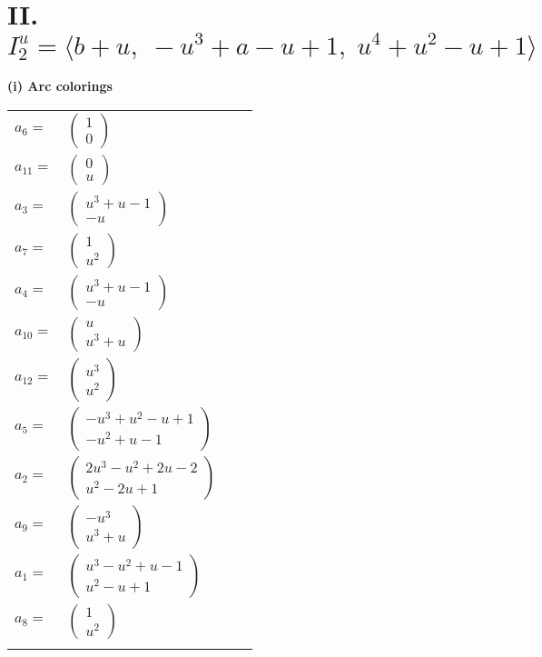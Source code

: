 \documentclass[1p]{elsarticle_modified}
\theoremstyle{definition}
\begin{document}
\centering \section*{II. $I^u_{2}= \langle b+u,\;- u^3+a- u+1,\;u^4+u^2- u+1 \rangle$}
\flushleft \textbf{(i) Arc colorings}\\
\begin{tabular}{m{7pt} m{180pt} m{7pt} m{180pt} }
\flushright $a_{6}=$&$\begin{pmatrix}1\\0\end{pmatrix}$ \\
\flushright $a_{11}=$&$\begin{pmatrix}0\\u\end{pmatrix}$ \\
\flushright $a_{3}=$&$\begin{pmatrix}u^3+u-1\\- u\end{pmatrix}$ \\
\flushright $a_{7}=$&$\begin{pmatrix}1\\u^2\end{pmatrix}$ \\
\flushright $a_{4}=$&$\begin{pmatrix}u^3+u-1\\- u\end{pmatrix}$ \\
\flushright $a_{10}=$&$\begin{pmatrix}u\\u^3+u\end{pmatrix}$ \\
\flushright $a_{12}=$&$\begin{pmatrix}u^3\\u^2\end{pmatrix}$ \\
\flushright $a_{5}=$&$\begin{pmatrix}- u^3+u^2- u+1\\- u^2+u-1\end{pmatrix}$ \\
\flushright $a_{2}=$&$\begin{pmatrix}2 u^3- u^2+2 u-2\\u^2-2 u+1\end{pmatrix}$ \\
\flushright $a_{9}=$&$\begin{pmatrix}- u^3\\u^3+u\end{pmatrix}$ \\
\flushright $a_{1}=$&$\begin{pmatrix}u^3- u^2+u-1\\u^2- u+1\end{pmatrix}$ \\
\flushright $a_{8}=$&$\begin{pmatrix}1\\u^2\end{pmatrix}$\\&\end{tabular}
\end{document}
